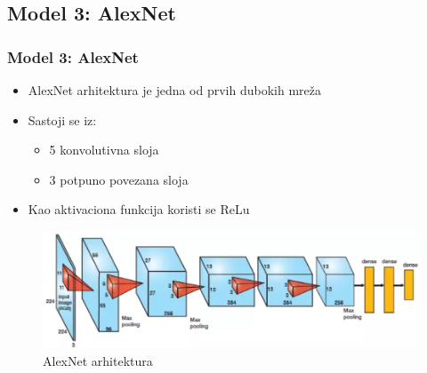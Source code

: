 \documentclass{beamer}
\begin{document}


\subsection{Model 3: AlexNet}
\begin{frame}
\frametitle{Model 3: AlexNet}

\begin{itemize}
\item AlexNet arhitektura je jedna od prvih dubokih mreža
\item Sastoji se iz:
\begin{itemize}
\item 5 konvolutivna sloja
\item 3 potpuno povezana sloja
\end{itemize}
\item Kao aktivaciona funkcija koristi se ReLu
\end{itemize}


\begin{figure}
\includegraphics[scale=0.55]{alexnet_arh.png}
\caption{AlexNet arhitektura}
\end{figure}


\end{frame}
\end{document}
